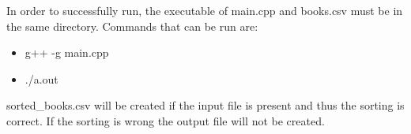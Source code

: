In order to successfully run, the executable of main.cpp and books.csv must be in the same directory. 
Commands that can be run are:
\begin{itemize}
\item g++ -g main.cpp
\item ./a.out
\end{itemize}
sorted\_books.csv will be created if the input file is present and thus the sorting is correct. If the sorting is wrong the output file will not be created. 
